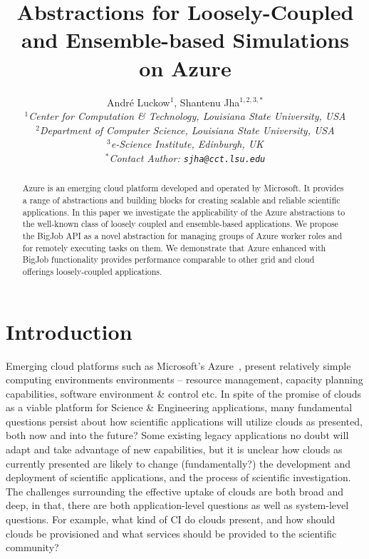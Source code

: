 \documentclass[conference,final]{IEEEtran}
\title{Abstractions for Loosely-Coupled and Ensemble-based Simulations
  on Azure\up}
\author{
Andr\'e Luckow$^{1}$, Shantenu Jha$^{1,2,3,*}$\\
  \small{\emph{$^{1}$Center for Computation \& Technology, Louisiana State University, USA}}\\
  \small{\emph{$^{2}$Department of Computer Science, Louisiana State University, USA}}\\
  \small{\emph{$^{3}$e-Science Institute, Edinburgh, UK}}\\
  \small{\emph{$^{*}$Contact Author: \texttt{sjha@cct.lsu.edu}}}\\
  \up\up\up\up
}
\newcommand{\up}{\vspace*{-1em}}
\begin{document}
 

\maketitle    

\begin{abstract}
  Azure is an emerging cloud platform developed and operated by
  Microsoft.  It provides a range of abstractions and building blocks
  for creating scalable and reliable scientific applications.  In this
  paper we investigate the applicability of the Azure abstractions to
  the well-known class of loosely coupled and ensemble-based
  applications.  We propose the BigJob API as a novel abstraction for
  managing groups of Azure worker roles and for remotely executing
  tasks on them. We demonstrate that Azure enhanced with BigJob
  functionality provides performance comparable to other grid and
  cloud offerings loosely-coupled applications.  \up \up

\end{abstract}

\section{Introduction}
\up
Emerging cloud platforms such as Microsoft's Azure~\cite{winazure},
present relatively simple computing environments environments –
resource management, capacity planning capabilities, software
environment \& control etc. In spite of the promise of clouds as a
viable platform for Science \& Engineering applications, many
fundamental questions persist about how scientific applications will
utilize clouds as presented, both now and into the future? Some
existing legacy applications no doubt will adapt and take advantage of
new capabilities, but it is unclear how clouds as currently presented
are likely to change (fundamentally?)  the development and deployment
of scientific applications, and the process of scientific
investigation. The challenges surrounding the effective uptake of
clouds are both broad and deep, in that, there are both
application-level questions as well as system-level questions. For
example, what kind of CI do clouds present, and how should clouds be
provisioned and what services should be provided to the scientific
community?
\end{document}
